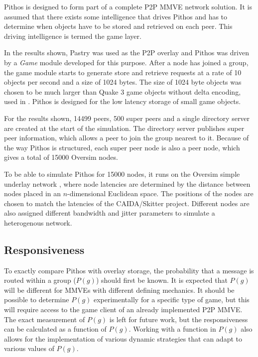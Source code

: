 \documentclass[10pt,a4paper,conference]{IEEEtran}
\begin{document}
Pithos is designed to form part of a complete P2P MMVE network solution. It is assumed that there exists some intelligence that drives Pithos and has
to determine when objects have to be stored and retrieved on each peer. This driving intelligence is termed the game layer.

In the results shown, Pastry was used as the P2P overlay and Pithos was driven by a \emph{Game} module developed for this purpose. After a node has
joined a group, the game module starts to generate store and retrieve requests at a rate of 10 objects per second and a size of 1024 bytes. The size
of 1024 byte objects was chosen to be much larger than Quake 3 game objects without delta encoding, used in \cite{Bharambe_Donnybrook}. Pithos is
designed for the low latency storage of small game objects.

For the results shown, 14499 peers, 500 super peers and a single directory server are created at the start of the simulation. The directory server
publishes super peer information, which allows a peer to join the group nearest to it. Because of the way Pithos is structured, each super peer node
is also a peer node, which gives a total of 15000 Oversim nodes.

To be able to simulate Pithos for 15000 nodes, it runs on the Oversim simple underlay network \cite{oversim_applications}, where node latencies are
determined by the distance between nodes placed in an $n$-dimensional Euclidean space. The positions of the nodes are chosen to match the latencies
of the CAIDA/Skitter project. Different nodes are also assigned different bandwidth and jitter parameters to simulate a heterogenous network.

\subsection{Responsiveness}

To exactly compare Pithos with overlay storage, the probability that a message is routed within a group ($P(g)$) should first be known. It is
expected that $P(g)$ will be different for MMVEs with different defining mechanics. It should be possible to determine $P(g)$ experimentally for a
specific type of game, but this will require access to the game client of an already implemented P2P MMVE. The exact measurement of $P(g)$ is left
for future work, but the responsiveness can be calculated as a function of $P(g)$. Working with a function in $P(g)$ also allows for the
implementation of various dynamic strategies that can adapt to various values of $P(g)$.
\end{document}

